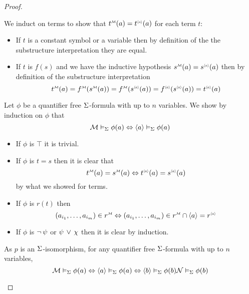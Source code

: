 \begin{proof}
    \begin{forward}
        We induct on terms to show that $\mmintp{t}(a) = \modintp{\<a\>}{t}(a)$
        for each term $t$:
        \begin{itemize}
            \item If $t$ is a constant symbol or a variable 
                then by definition of the 
                the substructure interpretation they are equal.
            \item If $t$ is $f(s)$ and we have the inductive hypothesis 
                $\mmintp{s}(a) = \modintp{\<a\>}{s}(a)$
                then by definition of the substructure interpretation
                \[
                    \mmintp{t}(a) = \mmintp{f}(\mmintp{s}(a))
                    = \mmintp{f}(\modintp{\<a\>}{s}(a))
                    = \modintp{\<a\>}{f}(\modintp{\<a\>}{s}(a))
                    = \modintp{\<a\>}{t}(a)
                \]
        \end{itemize}
    
    Let $\phi$ be a quantifier free $\Sigma$-formula with up to $n$ variables.
    We show by induction on $\phi$ that 
    \[
        \mathcal{M} \vDash_{\Sigma} \phi(a)
        \Leftrightarrow \langle a\rangle \vDash_{\Sigma} \phi(a)
    \]
    \begin{itemize}
        \item If $\phi$ is $\top$ it is trivial.
        \item If $\phi$ is $t = s$ then it is clear that
            \[
                \mmintp{t}(a) = \mmintp{s}(a)
                \iff \modintp{\<a\>}{t}(a) = \modintp{\<a\>}{s}(a)
            \]
            by what we showed for terms.
        \item If $\phi$ is $r(t)$ then 
            \[  
                (a_{i_1},\dots, a_{i_m}) \in \mmintp{r}
                \iff (a_{i_1},\dots, a_{i_m}) \in 
                \mmintp{r} \cap \<a\> = \modintp{\<a\>}{r}
            \]
        \item If $\phi$ is $\neg\, \psi$ or $\psi \, \lor \, \chi$ then it is 
            clear by induction.
    \end{itemize}
    As $p$ is an $\Sigma$-isomorphism, for any quantifier free $\Sigma$-formula
    with up to $n$ variables,
    \[\mathcal{M} \vDash_{\Sigma} \phi(a) \Leftrightarrow \langle a\rangle \vDash_{\Sigma} \phi(a)
    \Leftrightarrow \langle b\rangle \vDash_{\Sigma} \phi(b)
    \mathcal{N} \vDash_{\Sigma} \phi(b)\]
    \end{forward}


\end{proof}

